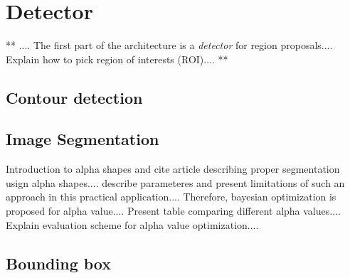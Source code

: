 \section{Detector}\label{section:region_proposals}
    \par{
        ** .... The first part of the architecture is a \emph{detector} for region proposals.... Explain how to pick region of interests (ROI).... **
    }
    \subsection{Contour detection}\label{subsection:contour_detection}
    \subsection{Image Segmentation}\label{subsection:segmentation}
        Introduction to alpha shapes and cite article describing proper segmentation usign alpha shapes.... describe parameteres and present limitations of such an approach in this practical application....
        Therefore, bayesian optimization is proposed for alpha value....
        Present table comparing different alpha values....
        Explain evaluation scheme for alpha value optimization....
    \subsection{Bounding box}\label{subsection:bounding_box}



